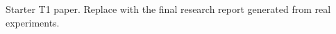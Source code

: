 \documentclass{article}
\begin{document}
Starter T1 paper. Replace with the final research report generated from real experiments.
\end{document}
